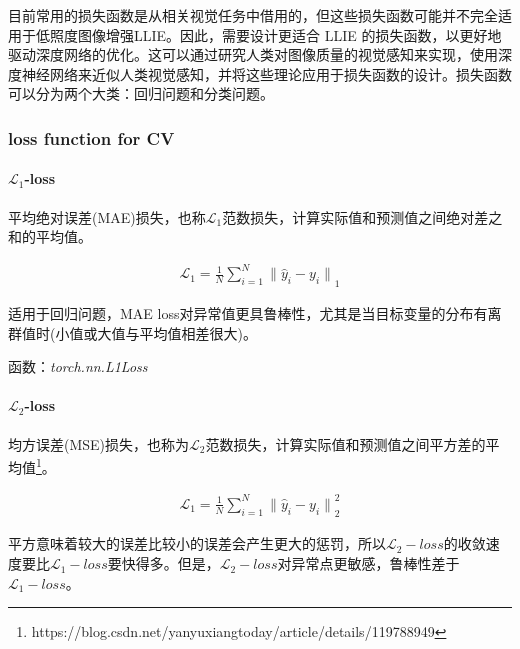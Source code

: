 \documentclass[letterpaper,12pt]{article}
\begin{document}
	目前常用的损失函数是从相关视觉任务中借用的，但这些损失函数可能并不完全适用于低照度图像增强LLIE。因此，需要设计更适合 LLIE 的损失函数，以更好地驱动深度网络的优化。这可以通过研究人类对图像质量的视觉感知来实现，使用深度神经网络来近似人类视觉感知，并将这些理论应用于损失函数的设计。损失函数可以分为两个大类：回归问题和分类问题。
	
	
	
	\subsubsection{loss function for CV}
	
	\paragraph{$\mathcal{L}_1$-loss}
	
	平均绝对误差(MAE)损失，也称$\mathcal{L}_1$范数损失，计算实际值和预测值之间绝对差之和的平均值。
	
	\begin{equation}
		\begin{aligned}
			\mathcal{L}_1 = \frac{1}{N} \sum_{i=1}^{N} {\| \hat{y}_i - y_i \|}_{1}
		\end{aligned}
	\end{equation}
	
	适用于回归问题，MAE loss对异常值更具鲁棒性，尤其是当目标变量的分布有离群值时(小值或大值与平均值相差很大)。
	
	函数：\textit{torch.nn.L1Loss}
	
	\paragraph{$\mathcal{L}_2$-loss}
	
	均方误差(MSE)损失，也称为$\mathcal{L}_2$范数损失，计算实际值和预测值之间平方差的平均值\footnote{https://blog.csdn.net/yanyuxiangtoday/article/details/119788949}。
	
	\begin{equation}
		\begin{aligned}
			\mathcal{L}_1 = \frac{1}{N} \sum_{i=1}^{N} {\| \hat{y}_i - y_i \|}_{2}^2
		\end{aligned}
	\end{equation}
	
	
	平方意味着较大的误差比较小的误差会产生更大的惩罚，所以$\mathcal{L}_2-loss$的收敛速度要比$\mathcal{L}_1-loss$要快得多。但是，$\mathcal{L}_2-loss$对异常点更敏感，鲁棒性差于$\mathcal{L}_1-loss$。
	
\end{document}
